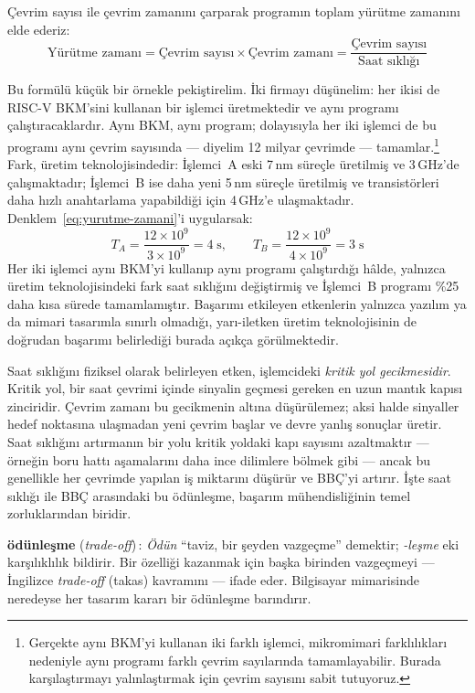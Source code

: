 Çevrim sayısı ile çevrim zamanını çarparak programın toplam yürütme zamanını elde ederiz:
\begin{equation}
\text{Yürütme zamanı} = \text{Çevrim sayısı} \times \text{Çevrim zamanı} = \frac{\text{Çevrim sayısı}}{\text{Saat sıklığı}}
\label{eq:yurutme-zamani}
\end{equation}

Bu formülü küçük bir örnekle pekiştirelim. İki firmayı düşünelim: her ikisi de RISC-V BKM'sini kullanan bir işlemci üretmektedir ve aynı programı çalıştıracaklardır. Aynı BKM, aynı program; dolayısıyla her iki işlemci de bu programı aynı çevrim sayısında --- diyelim 12 milyar çevrimde --- tamamlar.\footnote{Gerçekte aynı BKM'yi kullanan iki farklı işlemci, mikromimari farklılıkları nedeniyle aynı programı farklı çevrim sayılarında tamamlayabilir. Burada karşılaştırmayı yalınlaştırmak için çevrim sayısını sabit tutuyoruz.} Fark, üretim teknolojisindedir: İşlemci~A eski 7\,nm süreçle üretilmiş ve 3\,GHz'de çalışmaktadır; İşlemci~B ise daha yeni 5\,nm süreçle üretilmiş ve transistörleri daha hızlı anahtarlama yapabildiği için 4\,GHz'e ulaşmaktadır. Denklem~\ref{eq:yurutme-zamani}'i uygularsak:
%
\[
T_A = \frac{12 \times 10^9}{3 \times 10^9} = 4\;\text{s}, \qquad
T_B = \frac{12 \times 10^9}{4 \times 10^9} = 3\;\text{s}
\]
%
Her iki işlemci aynı BKM'yi kullanıp aynı programı çalıştırdığı hâlde, yalnızca üretim teknolojisindeki fark saat sıklığını değiştirmiş ve İşlemci~B programı \%25 daha kısa sürede tamamlamıştır. Başarımı etkileyen etkenlerin yalnızca yazılım ya da mimari tasarımla sınırlı olmadığı, yarı-iletken üretim teknolojisinin de doğrudan başarımı belirlediği burada açıkça görülmektedir.

Saat sıklığını fiziksel olarak belirleyen etken, işlemcideki \emph{kritik yol gecikmesidir}. Kritik yol, bir saat çevrimi içinde sinyalin geçmesi gereken en uzun mantık kapısı zinciridir. Çevrim zamanı bu gecikmenin altına düşürülemez; aksi halde sinyaller hedef noktasına ulaşmadan yeni çevrim başlar ve devre yanlış sonuçlar üretir. Saat sıklığını artırmanın bir yolu kritik yoldaki kapı sayısını azaltmaktır --- örneğin boru hattı aşamalarını daha ince dilimlere bölmek gibi --- ancak bu genellikle her çevrimde yapılan iş miktarını düşürür ve BBÇ'yi artırır. İşte saat sıklığı ile BBÇ arasındaki bu ödünleşme, başarım mühendisliğinin temel zorluklarından biridir.

\begin{terimnotu}
\textbf{ödünleşme} (\emph{trade-off})\,: \emph{Ödün} ``taviz, bir şeyden vazgeçme'' demektir; \emph{-leşme} eki karşılıklılık bildirir. Bir özelliği kazanmak için başka birinden vazgeçmeyi --- İngilizce \emph{trade-off} (takas) kavramını --- ifade eder. Bilgisayar mimarisinde neredeyse her tasarım kararı bir ödünleşme barındırır.
\end{terimnotu}

